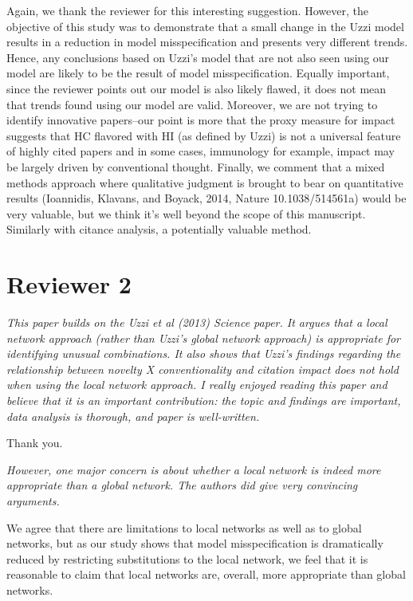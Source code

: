 \documentclass[11pt, oneside]{article}   	%
\begin{document}
Again, we thank the reviewer for this interesting suggestion. However, the objective of this study was to demonstrate that a small change in the  Uzzi model results in a reduction in model misspecification and presents very different trends. Hence, any conclusions based on Uzzi's model that are not also seen  using our model are likely to be the result of  model misspecification. Equally important, since the reviewer points out our model is also likely flawed, it does not mean that trends found using our model are valid. Moreover, we are not trying to identify innovative papers--our point is more that the proxy measure for impact suggests that HC flavored with HI (as defined by Uzzi) is not a universal feature of highly cited papers and in some cases, immunology for example, impact may be largely driven by conventional thought. Finally, we comment that a mixed methods approach where qualitative judgment is brought to bear on quantitative results (Ioannidis, Klavans, and Boyack, 2014, Nature 10.1038/514561a) would be very valuable, but we think it's well beyond the scope of this manuscript. Similarly with citance analysis, a potentially valuable method.

\section{Reviewer 2}

\emph{This paper builds on the Uzzi et al (2013) Science paper.  It argues that a local network approach (rather than Uzzi's global network approach) is appropriate for identifying unusual combinations.  It also shows that Uzzi's findings regarding the relationship between novelty X conventionality and citation impact does not hold when using the local network approach. I really enjoyed reading this paper and believe that it is an important contribution: the topic and findings are important, data analysis is thorough, and paper is well-written.}

Thank you. 
 
\emph{However, one major concern is about whether a local network is indeed more appropriate than a global network.  The authors did give very convincing arguments. }

We agree that there are limitations to local networks as well as to global networks, but as our study shows that model misspecification is dramatically reduced by restricting substitutions to the local network, we feel that it is reasonable to claim that local networks are, overall, more appropriate
than global networks.
\end{document}
